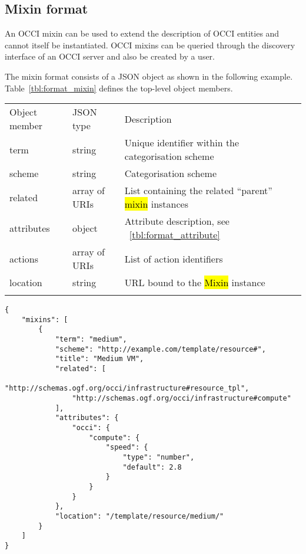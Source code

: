 \documentclass[10pt,a4paper]{article}
\begin{document}
\subsection{Mixin format}

An OCCI mixin can be used to extend the description of OCCI entities and cannot itself be 
instantiated. OCCI mixins can be queried through the discovery interface 
of an OCCI server and also be created by a user.

The mixin format consists of a JSON object as shown in the
following example.
Table~\ref{tbl:format_mixin} defines the top-level object members.

 {
    \begin{tabular}{llll}
    \toprule
    Object member & JSON type & Description \\
    \colrule
    term & string & Unique identifier within the categorisation scheme \\
    scheme & string & Categorisation scheme \\
    related & array of URIs & List containing the related ``parent'' \hl{mixin} instances \\
    attributes & object & Attribute description, see ~\ref{tbl:format_attribute} \\
    actions & array of URIs & List of action identifiers \\
    location & string & URL bound to the \hl{Mixin} instance \\
    \botrule
    \end{tabular}
}

\begin{verbatim}
{
    "mixins": [
        {
            "term": "medium",
            "scheme": "http://example.com/template/resource#",
            "title": "Medium VM",
            "related": [
                "http://schemas.ogf.org/occi/infrastructure#resource_tpl",
                "http://schemas.ogf.org/occi/infrastructure#compute"
            ],
            "attributes": {
                "occi": {
                    "compute": {
                        "speed": {
                            "type": "number",
                            "default": 2.8
                        }
                    }
                }
            },
            "location": "/template/resource/medium/"
        }
    ]
}
\end{verbatim}
\end{document}
